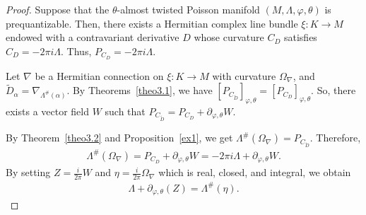 \documentclass[a4paper,10pt]{article}
\numberwithin{equation}{section}
\theoremstyle{plain}
\newcommand{\CD}{C_D}
\newcommand{\PCD}{P_{\CD}}
\begin{document}
	\begin{proof}
		Suppose that the  $\theta$-almost twisted Poisson manifold  $(M,\Lambda,\varphi,\theta)$ is prequantizable.  Then, there exists a Hermitian complex line bundle $\xi: K\to M$ endowed with a contravariant derivative $D$ whose curvature $C_D$ satisfies $ C_D=-2\pi i\Lambda.$ Thus, $P_{C_D}=-2\pi i\Lambda$.
		
		
		Let \(\nabla\) be a Hermitian connection on $\xi: K\to M$ with curvature \(\Omega_\nabla\), and $\widetilde{D}_\alpha = \nabla_{{\Lambda^{\#}(\alpha)}}$. By Theorems~\ref{theo3.1}, we have
		$[P_{C_{\widetilde{D}}}]_{\varphi,\theta} = [\PCD]_{\varphi,\theta}$.
		So, there exists a vector field $W$  such that
		$P_{C_{\widetilde{D}}} = \PCD + \partial_{\varphi,\theta} W $.
		
		By Theorem~\ref{theo3.2} and Proposition~\ref{ex1}, we get
		$\Lambda^{\#}(\Omega_\nabla)=P_{C_{\widetilde{D}}}$.
		Therefore,
		\begin{align*}
		\Lambda^{\#}(\Omega_\nabla)=\PCD + \partial_{\varphi,\theta} W=-2\pi i\Lambda+ \partial_{\varphi,\theta} W.
		\end{align*}
		By setting $Z= \frac{i}{2\pi} W$ and  \(\eta = \frac{i}{2\pi} \Omega_\nabla\) which is real, closed, and integral, we obtain
		\begin{align*}
		\Lambda+\partial_{\varphi,\theta}(Z)=\Lambda^{\#}(\eta).
		\end{align*}
		

\end{proof}
\end{document}
